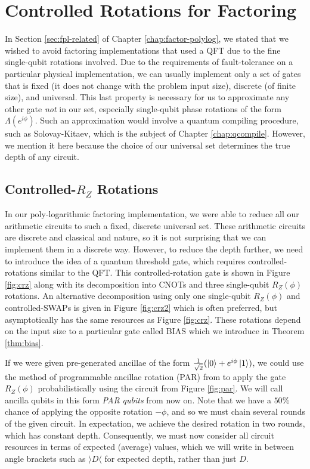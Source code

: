 \section{Controlled Rotations for Factoring}
\label{sec:fsl-qcompile}

In Section \ref{sec:fpl-related} of Chapter \ref{chap:factor-polylog},
we stated that we wished to avoid
factoring implementations that used a QFT due to the fine
single-qubit rotations involved. Due to the requirements of
fault-tolerance on a particular physical implementation,
we can usually implement only a set of gates that is fixed
(it does not change with the problem input size), discrete (of finite size),
and universal. This last property is necessary for us to approximate any
other gate \emph{not} in our set, especially single-qubit phase rotations
of the form $\Lambda(e^{i \phi})$. Such an approximation would involve
a quantum compiling procedure, such as Solovay-Kitaev, which is the
subject of Chapter \ref{chap:qcompile}. However, we mention it here
because the choice of our universal set determines the true depth
of any circuit.

\subsection{Controlled-$R_Z$ Rotations}

In our poly-logarithmic factoring implementation, we were able to reduce
all our arithmetic circuits to such a fixed, discrete universal set.
These arithmetic circuits are discrete and classical and nature, so it is
not surprising that we can implement them in a discrete way.
However, to reduce the depth further, we need to introduce the idea of
a quantum threshold gate, which requires controlled-rotations similar to
the QFT. This controlled-rotation gate is shown in Figure \ref{fig:crz}
along with its decomposition into CNOTs and three single-qubit $R_Z(\phi)$
rotations. An alternative decomposition using only one single-qubit
$R_Z(\phi)$ and controlled-SWAPs is given in Figure \ref{fig:crz2} which
is often preferred, but asymptotically has the same resources as
Figure \ref{fig:crz}.
These rotations depend on the input size to a particular gate called
BIAS which we introduce in Theorem \ref{thm:bias}.

If we were given pre-generated ancillae of the form
$\frac{1}{\sqrt{2}} (\left\vert{0}\right\rangle + e^{i\phi}\left\vert{1}\right\rangle)$,
we could use the method of programmable ancillae rotation (PAR) from
\cite{Jones2012}
to apply the gate $R_Z(\phi)$ probabilistically
using the circuit from Figure \ref{fig:par}.
We will call ancilla qubits in this form \emph{PAR qubits} from now on.
Note that we have a $50\%$
chance
of applying the opposite rotation $-\phi$, and so we must chain
several rounds of the given circuit. In expectation, we achieve the
desired rotation in two rounds, which has constant depth.
Consequently, we must now consider
all circuit resources in terms of expected (average) values, which we will
write in between angle brackets such as $\rangle D \langle$ for expected
depth, rather than just $D$.

